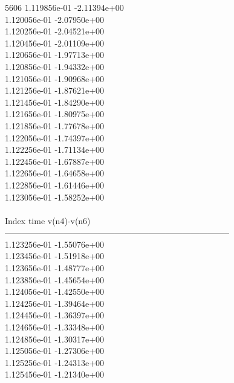 5606	1.119856e-01	-2.11394e+00	\\ 	1.120056e-01	-2.07950e+00	\\ 	1.120256e-01	-2.04521e+00	\\ 	1.120456e-01	-2.01109e+00	\\ 	1.120656e-01	-1.97713e+00	\\ 	1.120856e-01	-1.94332e+00	\\ 	1.121056e-01	-1.90968e+00	\\ 	1.121256e-01	-1.87621e+00	\\ 	1.121456e-01	-1.84290e+00	\\ 	1.121656e-01	-1.80975e+00	\\ 	1.121856e-01	-1.77678e+00	\\ 	1.122056e-01	-1.74397e+00	\\ 	1.122256e-01	-1.71134e+00	\\ 	1.122456e-01	-1.67887e+00	\\ 	1.122656e-01	-1.64658e+00	\\ 	1.122856e-01	-1.61446e+00	\\ 	1.123056e-01	-1.58252e+00	\\ \hline
\\ \hline
Index   time            v(n4)-v(n6)     \\ \hline
--------------------------------------------------------------------------------\\ 	1.123256e-01	-1.55076e+00	\\ 	1.123456e-01	-1.51918e+00	\\ 	1.123656e-01	-1.48777e+00	\\ 	1.123856e-01	-1.45654e+00	\\ 	1.124056e-01	-1.42550e+00	\\ 	1.124256e-01	-1.39464e+00	\\ 	1.124456e-01	-1.36397e+00	\\ 	1.124656e-01	-1.33348e+00	\\ 	1.124856e-01	-1.30317e+00	\\ 	1.125056e-01	-1.27306e+00	\\ 	1.125256e-01	-1.24313e+00	\\ 	1.125456e-01	-1.21340e+00	\\ \hline
